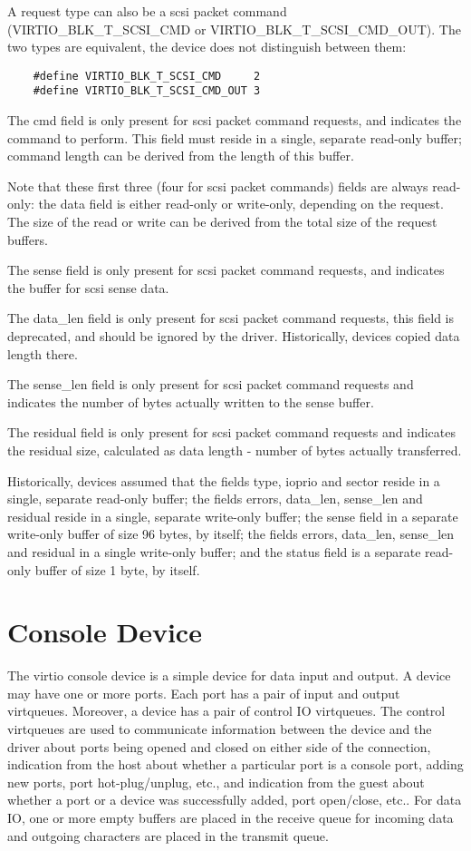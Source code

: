 A request type can also be a scsi packet command (VIRTIO_BLK_T_SCSI_CMD or
VIRTIO_BLK_T_SCSI_CMD_OUT).  The two types are equivalent, the device
does not distinguish between them:

\begin{lstlisting}
	#define VIRTIO_BLK_T_SCSI_CMD     2
	#define VIRTIO_BLK_T_SCSI_CMD_OUT 3
\end{lstlisting}

The cmd field is only present for scsi packet command requests,
and indicates the command to perform. This field must reside in a
single, separate read-only buffer; command length can be derived
from the length of this buffer.

Note that these first three (four for scsi packet commands)
fields are always read-only: the data field is either read-only
or write-only, depending on the request. The size of the read or
write can be derived from the total size of the request buffers.

The sense field is only present for scsi packet command requests,
and indicates the buffer for scsi sense data.

The data_len field is only present for scsi packet command
requests, this field is deprecated, and should be ignored by the
driver. Historically, devices copied data length there.

The sense_len field is only present for scsi packet command
requests and indicates the number of bytes actually written to
the sense buffer.

The residual field is only present for scsi packet command
requests and indicates the residual size, calculated as data
length - number of bytes actually transferred.

Historically, devices assumed that the fields type, ioprio and
sector reside in a single, separate read-only buffer; the fields
errors, data_len, sense_len and residual reside in a single,
separate write-only buffer; the sense field in a separate
write-only buffer of size 96 bytes, by itself; the fields errors,
data_len, sense_len and residual in a single write-only buffer;
and the status field is a separate read-only buffer of size 1
byte, by itself.


\section{Console Device}\label{sec:Device Types / Console Device}

The virtio console device is a simple device for data input and
output. A device may have one or more ports. Each port has a pair
of input and output virtqueues. Moreover, a device has a pair of
control IO virtqueues. The control virtqueues are used to
communicate information between the device and the driver about
ports being opened and closed on either side of the connection,
indication from the host about whether a particular port is a
console port, adding new ports, port hot-plug/unplug, etc., and
indication from the guest about whether a port or a device was
successfully added, port open/close, etc.. For data IO, one or
more empty buffers are placed in the receive queue for incoming
data and outgoing characters are placed in the transmit queue.


